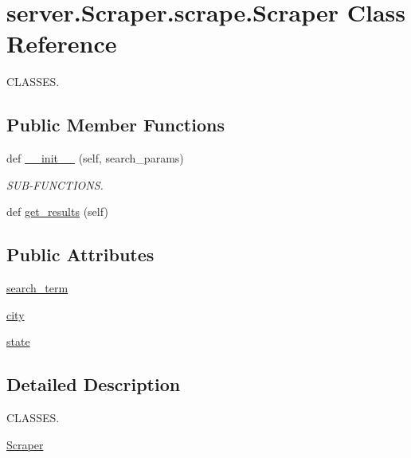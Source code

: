 \hypertarget{classserver_1_1_scraper_1_1scrape_1_1_scraper}{}\section{server.\+Scraper.\+scrape.\+Scraper Class Reference}
\label{classserver_1_1_scraper_1_1scrape_1_1_scraper}


C\+L\+A\+S\+S\+ES.  


\subsection*{Public Member Functions}
\begin{DoxyCompactItemize}
\item 
def \mbox{\hyperlink{classserver_1_1_scraper_1_1scrape_1_1_scraper_a95f25aa269db339cee574652685b4ec3}{\+\_\+\+\_\+init\+\_\+\+\_\+}} (self, search\+\_\+params)
\begin{DoxyCompactList}\small\item\em S\+U\+B-\/\+F\+U\+N\+C\+T\+I\+O\+NS. \end{DoxyCompactList}\item 
def \mbox{\hyperlink{classserver_1_1_scraper_1_1scrape_1_1_scraper_a8500c13f880e66623effd042f763c0fb}{get\+\_\+results}} (self)
\end{DoxyCompactItemize}
\subsection*{Public Attributes}
\begin{DoxyCompactItemize}
\item 
\mbox{\hyperlink{classserver_1_1_scraper_1_1scrape_1_1_scraper_aafe46c1aad2b3e1a17bfbfe5ff76eee0}{search\+\_\+term}}
\item 
\mbox{\hyperlink{classserver_1_1_scraper_1_1scrape_1_1_scraper_a949d360a3dba9a89d3b6e449b01ea713}{city}}
\item 
\mbox{\hyperlink{classserver_1_1_scraper_1_1scrape_1_1_scraper_aa661980e9576885bf5a4d3f2193978bd}{state}}
\end{DoxyCompactItemize}


\subsection{Detailed Description}
C\+L\+A\+S\+S\+ES. 

\mbox{\hyperlink{classserver_1_1_scraper_1_1scrape_1_1_scraper}{Scraper}}

